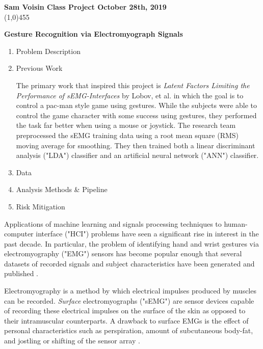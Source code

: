 \documentclass[11pt]{article}
\begin{document}
\noindent \textbf{Sam Voisin \hfill  \textbf{Class Project}  \hfill  October 28th, 2019} \\
\line(1,0){455}

\begin{center}
\Large{{\bf Gesture Recognition via Electromyograph Signals}}\\
\end{center}

\begin{enumerate}
\item Problem Description

\item Previous Work

The primary work that inspired this project is  \emph{Latent Factors Limiting the Performance of sEMG-Interfaces} by Lobov, et al. \cite{lobov} in which the goal is to control a pac-man style game using gestures. While the subjects were able to control the game character with some success using gestures, they performed the task far better when using a mouse or joystick. The research team preprocessed the sEMG training data using a root mean square (RMS) moving average for smoothing. They then trained both a linear discriminant analysis ("LDA") classifier and an artificial neural network ("ANN") classifier.

\item Data

\item Analysis Methods \& Pipeline

\item Risk Mitigation

\end{enumerate}

Applications of machine learning and signals processing techniques to human-computer interface ("HCI") problems have seen a significant rise in interest in the past decade. In particular, the problem of identifying hand and wrist gestures via electromyography ("EMG") sensors has become popular enough that several datasets of recorded signals and subject characteristics have been generated and published \cite{ninapro} \cite{lobov}.

Electromyography is a method by which electrical impulses produced by muscles can be recorded. \emph{Surface} electromyographs ("sEMG") are sensor devices capable of recording these electrical impulses on the surface of the skin as opposed to their intramuscular counterparts. A drawback to surface EMGs is the effect of personal characteristics such as perspiration, amount of subcutaneous body-fat, and jostling or shifting of the sensor array \cite{lobov}.
\end{document}
